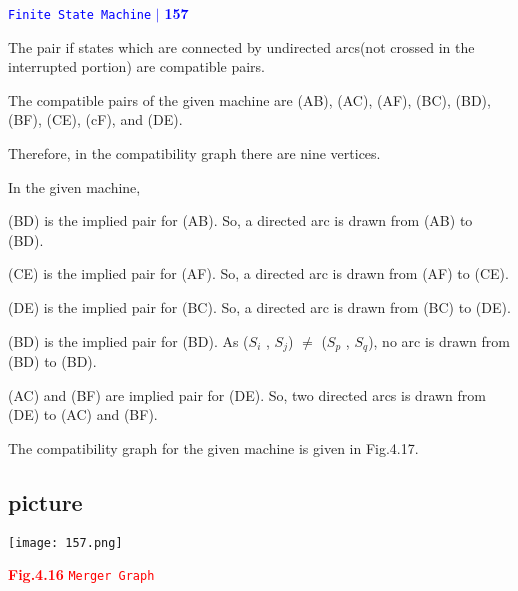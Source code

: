 \documentclass[a4]{article}
\begin{document}
\begin{flushright}
 \textcolor{blue}{\hspace*{0.5cm} \texttt{Finite State Machine} \hspace*{0.10cm}\textbf{$|$} \textbf{157}\hspace*{0.5cm}}
\end{flushright}

\vspace*{1cm}


The pair if states which are connected by undirected arcs(not crossed in the interrupted portion) are compatible pairs.



The compatible pairs of the given machine are (AB), (AC), (AF), (BC), (BD), (BF), (CE), (cF), and (DE).



Therefore, in the compatibility graph there are nine vertices.



In the given machine,
\vspace*{0.10cm}

(BD) is the implied pair for (AB). So, a directed arc is drawn from (AB) to (BD).




(CE) is the implied pair for (AF). So, a directed arc is drawn from (AF) to (CE).



(DE) is the implied pair for (BC). So, a directed arc is drawn from (BC) to (DE).



(BD) is the implied pair for (BD). As ($S_{i}$ , $S_{j}$) $\neq$ ($S_{p}$ , $S_{q}$), no arc is drawn from (BD) to (BD).



(AC) and (BF) are implied pair for (DE). So, two directed arcs is drawn from (DE) to (AC) and (BF).



The compatibility graph for the given machine is given in Fig.4.17.



\begin{center}
  \section{picture}
\texttt{[image: 157.png]}
\end{center}
\textcolor{red}{\centerline{\textbf{Fig.4.16} \hspace*{0.5cm} \texttt{Merger Graph}}}
\end{document}
